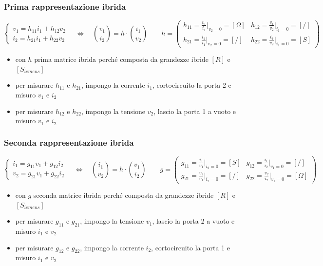 \documentclass[a4paper]{article}
\begin{document}
\subsubsection*{Prima rappresentazione ibrida}
\[\begin{cases}
	v_1 = h_{11} i_1 + h_{12} v_2 \\
	i_2 = h_{21} i_1 + h_{22} v_2
\end{cases} \quad \Leftrightarrow \quad
\binom{v_1}{i_2} = h \cdot \binom{i_1}{v_2} \qquad
h = \left( \begin{matrix}
	h_{11} = \frac{v_1}{i_1} \Big|_{v_2=0} = [\Omega] & h_{12} = \frac{v_1}{v_2} \Big|_{i_1=0} = [/] \\[8pt]
	h_{21} = \frac{i_2}{i_1} \Big|_{v_2=0} = [/] & h_{22} = \frac{i_2}{v_2} \Big|_{i_1=0} = [S]
\end{matrix} \right)\]
\begin{itemize}
	\item con \(h\) prima matrice ibrida perché composta da grandezze ibride \([R]\) e \([S_{iemens}]\)
	\item per misurare \(h_{11}\) e \(h_{21}\), impongo la corrente \(i_1\), cortocircuito la porta 2 e misuro \(v_1\) e \(i_2\)
	\item per misurare \(h_{12}\) e \(h_{22}\), impongo la tensione \(v_2\), lascio la porta 1 a vuoto e misuro \(v_1\) e \(i_2\)
\end{itemize}

\subsubsection*{Seconda rappresentazione ibrida}
\[\begin{cases}
	i_1 = g_{11} v_1 + g_{12} i_2 \\
	v_2 = g_{21} v_1 + g_{22} i_2
\end{cases} \quad \Leftrightarrow \quad
\binom{i_1}{v_2} = h \cdot \binom{v_1}{i_2} \qquad
g = \left( \begin{matrix}
	g_{11} = \frac{i_1}{v_1} \Big|_{i_2=0} = [S] & g_{12} = \frac{i_1}{i_2} \Big|_{v_1=0} = [/] \\[8pt]
	g_{21} = \frac{v_2}{v_1} \Big|_{i_2=0} = [/] & g_{22} = \frac{v_2}{i_2} \Big|_{v_1=0} = [\Omega]
\end{matrix} \right)\]
\begin{itemize}
	\item con \(g\) seconda matrice ibrida perché composta da grandezze ibride \([R]\) e \([S_{iemens}]\)
	\item per misurare \(g_{11}\) e \(g_{21}\), impongo la tensione \(v_1\), lascio la porta 2 a vuoto e misuro \(i_1\) e \(v_2\)
	\item per misurare \(g_{12}\) e \(g_{22}\), impongo la corrente \(i_2\), cortocircuito la porta 1 e misuro \(i_1\) e \(v_2\)
\end{itemize}
\end{document}
